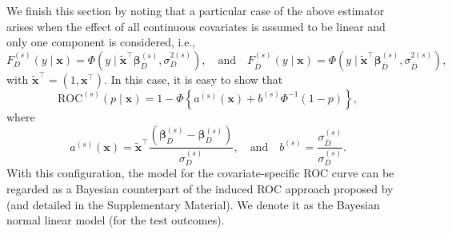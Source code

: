 We finish this section by noting that a particular case of the above estimator arises when the effect of all continuous covariates is assumed to be linear and only one component is considered, i.e.,
\begin{equation}
F_{D}^{(s)}(y \mid \mathbf{x}) = \Phi\left(y \mid \tilde{\mathbf{x}}^{\top}\boldsymbol{\beta}^{(s)}_{D},\sigma_{D}^{2(s)}\right),\quad \text{and}\quad F^{(s)}_{\bar{D}}(y \mid \mathbf{x}) = \Phi\left(y \mid \tilde{\mathbf{x}}^{\top}\boldsymbol{\beta}^{(s)}_{\bar{D}},\sigma_{\bar{D}}^{2(s)}\right),
\label{cROC_bp}
\end{equation}
with $\tilde{\mathbf{x}}^{\top}=\left(1,\mathbf{x}^{\top}\right)$. In this case, it is easy to show that
\begin{equation}
\text{ROC}^{(s)}(p\mid\mathbf{x})=1-\Phi\left\{a^{(s)}(\mathbf{x})+b^{(s)}\Phi^{-1}(1-p)\right\},
\label{cROC-a-b-bp}
\end{equation}
where
\begin{equation}
a^{(s)}(\mathbf{x}) =\tilde{\mathbf{x}}^{\top}\frac{\left(\boldsymbol{\beta}^{(s)}_{\bar{D}}-\boldsymbol{\beta}^{(s)}_D\right)}{\sigma_D^{(s)}},\quad \text{and}\quad b^{(s)} =\frac{\sigma^{(s)}_{\bar{D}}}{\sigma_D^{(s)}}.
\label{a-b-bp}
\end{equation}
With this configuration, the model for the covariate-specific ROC curve can be regarded as a Bayesian counterpart of the induced ROC approach proposed by \cite{Faraggi03} (and detailed in the Supplementary Material). We denote it as the Bayesian normal linear model (for the test outcomes).

